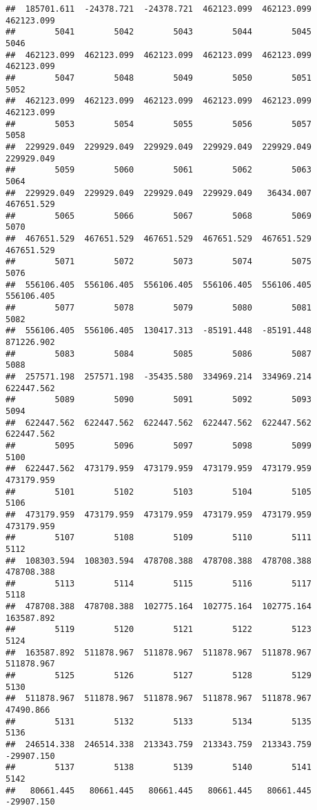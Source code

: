 \documentclass[
]{book}
\begin{document}
\begin{verbatim}
##  185701.611  -24378.721  -24378.721  462123.099  462123.099  462123.099 
##        5041        5042        5043        5044        5045        5046 
##  462123.099  462123.099  462123.099  462123.099  462123.099  462123.099 
##        5047        5048        5049        5050        5051        5052 
##  462123.099  462123.099  462123.099  462123.099  462123.099  462123.099 
##        5053        5054        5055        5056        5057        5058 
##  229929.049  229929.049  229929.049  229929.049  229929.049  229929.049 
##        5059        5060        5061        5062        5063        5064 
##  229929.049  229929.049  229929.049  229929.049   36434.007  467651.529 
##        5065        5066        5067        5068        5069        5070 
##  467651.529  467651.529  467651.529  467651.529  467651.529  467651.529 
##        5071        5072        5073        5074        5075        5076 
##  556106.405  556106.405  556106.405  556106.405  556106.405  556106.405 
##        5077        5078        5079        5080        5081        5082 
##  556106.405  556106.405  130417.313  -85191.448  -85191.448  871226.902 
##        5083        5084        5085        5086        5087        5088 
##  257571.198  257571.198  -35435.580  334969.214  334969.214  622447.562 
##        5089        5090        5091        5092        5093        5094 
##  622447.562  622447.562  622447.562  622447.562  622447.562  622447.562 
##        5095        5096        5097        5098        5099        5100 
##  622447.562  473179.959  473179.959  473179.959  473179.959  473179.959 
##        5101        5102        5103        5104        5105        5106 
##  473179.959  473179.959  473179.959  473179.959  473179.959  473179.959 
##        5107        5108        5109        5110        5111        5112 
##  108303.594  108303.594  478708.388  478708.388  478708.388  478708.388 
##        5113        5114        5115        5116        5117        5118 
##  478708.388  478708.388  102775.164  102775.164  102775.164  163587.892 
##        5119        5120        5121        5122        5123        5124 
##  163587.892  511878.967  511878.967  511878.967  511878.967  511878.967 
##        5125        5126        5127        5128        5129        5130 
##  511878.967  511878.967  511878.967  511878.967  511878.967   47490.866 
##        5131        5132        5133        5134        5135        5136 
##  246514.338  246514.338  213343.759  213343.759  213343.759  -29907.150 
##        5137        5138        5139        5140        5141        5142 
##   80661.445   80661.445   80661.445   80661.445   80661.445  -29907.150 

\end{verbatim}
\end{document}
